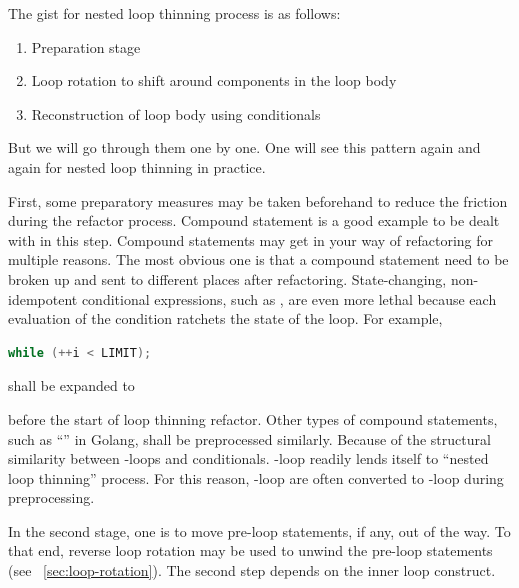 The gist for nested loop thinning process is as follows:
\begin{enumerate}
    \item Preparation stage
    \item Loop rotation to shift around components in the loop body
    \item Reconstruction of loop body using conditionals
\end{enumerate}
But we will go through them one by one.
One will see this pattern again and again for nested loop thinning in practice.


First, some preparatory measures may be taken beforehand
to reduce the friction during the refactor process.
Compound statement is a good example to be dealt with in this step.
Compound statements may get in your way of refactoring for multiple reasons.
The most obvious one is that a compound statement
need to be broken up and sent to different places after refactoring.
State-changing, non-idempotent conditional expressions, such as ,
are even more lethal because each evaluation of the condition ratchets the state of the loop.
For example,

\begin{minipage}[c]{.3\textwidth}
    \begin{lstlisting}[language=C]
        while (++i < LIMIT);
    \end{lstlisting}
\end{minipage}
\hfill
\begin{minipage}[c]{.3\textwidth}
    shall be expanded to
\end{minipage}
\begin{minipage}[c]{.3\textwidth}
    
\end{minipage}

before the start of loop thinning refactor.
Other types of compound statements, such as ``'' in Golang, shall be
preprocessed similarly.
Because of the structural similarity between -loops and conditionals.
-loop readily lends itself to ``nested loop thinning'' process.
For this reason, -loop are often converted to -loop during preprocessing.


In the second stage, one is to move pre-loop statements, if any, out of the way.
To that end, reverse loop rotation may be used
to unwind the pre-loop statements (see ~\autoref{sec:loop-rotation}).
The second step depends on the inner loop construct.


